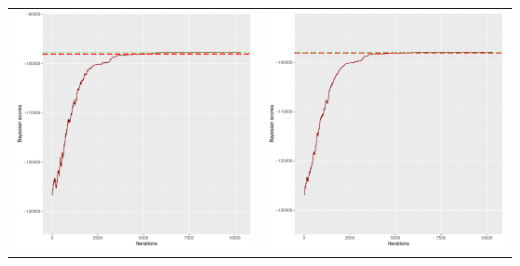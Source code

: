 \documentclass[]{scrartcl}
\begin{document}
\begin{table}[h!]
\begin{tabular}{cc}
\includegraphics[scale = 0.4]{./figs/hepar2/v4/25/bayBoundsEvolution-10352.pdf} & 
\includegraphics[scale = 0.4]{./figs/hepar2/v4/50/bayBoundsEvolution-10352.pdf} \\

\end{tabular}
\end{table}
\end{document}
